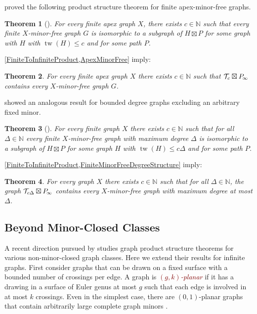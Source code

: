 \documentclass[a4paper,11pt]{article}
\makeatletter
\newcommand{\hdefn}[2]{\textcolor{Maroon}{\emph{#1-#2}}\index{#2@#1-#2}}
\theoremstyle{plain}
\newtheorem{thm}{Theorem}[section]
\theoremstyle{definition}
\renewcommand{\leq}{\leqslant}
\DeclareMathOperator{\tw}{tw}
\newcommand{\PP}{P_{\hspace{-0.25ex}\infty}}
\newcommand{\TT}{\mathcal{T}}
\newcommand{\NN}{\mathbb{N}}
\makeatother
\begin{document}
\citet{DJMMUW20} proved the following product structure theorem for finite apex-minor-free graphs. 

\begin{thm}[\citep{DJMMUW20}] 
\label{ApexMinorFree}
For every finite apex graph $X$, there exists $c\in\NN$ such that every finite  $X$-minor-free graph $G$ is isomorphic to a subgraph of $H\boxtimes P$ for some graph with $H$ with $\tw(H)\leq c$ and for some path $P$.
\end{thm}

\cref{FiniteToInfiniteProduct,ApexMinorFree} imply:

\begin{thm} 
For every finite apex graph $X$ there exists $c\in \NN$ such that $\TT_c \boxtimes \PP$ contains  every  $X$-minor-free graph $G$.
\end{thm}

\citet{DEMWW} showed an analogous result for  bounded degree graphs excluding an arbitrary fixed minor.

\begin{thm}[\citep{DEMWW}]
\label{FiniteMinorFreeDegreeStructure}
For every finite graph $X$ there exists $c\in\NN$ such that for all $\Delta\in\NN$ every finite $X$-minor-free graph with maximum degree $\Delta$ is isomorphic to a subgraph of $H\boxtimes P$ for some graph $H$ with $\tw(H) \leq c\Delta$ and for some path $P$. \end{thm}

\cref{FiniteToInfiniteProduct,FiniteMinorFreeDegreeStructure} imply:

\begin{thm}
\label{MinorFreeDegreeStructure}
For every graph $X$ there exists $c\in\NN$ such that for all $\Delta\in\NN$, the graph $\TT_{c\Delta} \boxtimes \PP$ contains every  $X$-minor-free graph with maximum degree at most $\Delta$.
\end{thm}

\subsection{Beyond Minor-Closed Classes}
\label{NonMinorClosed}

A recent direction pursued by \citet{DMW19b} studies graph product structure theorems for various non-minor-closed graph classes. Here we extend their results for infinite graphs. First consider graphs that can be drawn on a fixed surface with a bounded number of crossings per edge. A graph is \hdefn{$(g,k)$}{planar} if it has a drawing in a surface of Euler genus at most $g$ such that each edge is involved in at most $k$ crossings. Even in the simplest case, there are $(0,1)$-planar graphs that contain arbitrarily large complete graph minors \citep{DEW17}. 
\end{document}
